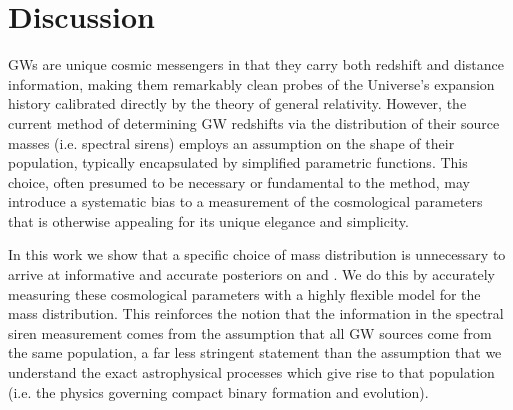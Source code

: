 \documentclass[preprint2,linenumbers]{aastex631}
\begin{document}
% 

\section{Discussion}
\label{sec:discussion}

\acp{GW} are unique cosmic messengers in that they carry both redshift and distance information, making them remarkably clean probes of the Universe's expansion history calibrated directly by the theory of general relativity. 
However, the current method of determining \ac{GW} redshifts via the distribution of their source masses (i.e. spectral sirens) employs an assumption on the shape of their population, typically encapsulated by simplified parametric functions. 
This choice, often presumed to be necessary or fundamental to the method, may introduce a systematic bias to a measurement of the cosmological parameters that is otherwise appealing for its unique elegance and simplicity.
    
In this work we show that a specific choice of mass distribution is unnecessary to arrive at informative and accurate posteriors on \Ho{} and \Omm{}.
We do this by accurately measuring these cosmological parameters with a highly flexible model for the mass distribution. 
This reinforces the notion that the information in the spectral siren measurement comes from the assumption that all \ac{GW} sources come from the same population, a far less stringent statement than the assumption that we understand the exact astrophysical processes which give rise to that population (i.e. the physics governing compact binary formation and evolution).
\end{document}
